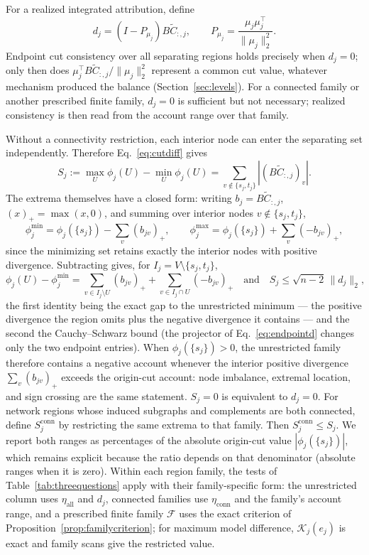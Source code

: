 \documentclass[a4paper,fleqn]{cas-sc}
\newcommand{\norm}[1]{\lVert #1 \rVert}
\begin{document}
For a realized integrated attribution, define
\begin{equation}
d_j=(I-P_{\mu_j})B\widetilde C_{:,j},\qquad
P_{\mu_j}=\frac{\mu_j\mu_j^\top}{\norm{\mu_j}_2^2}.
\label{eq:endpointd}
\end{equation}
Endpoint cut consistency over all separating regions holds precisely when
$d_j=0$; only then does
$\mu_j^\top B\widetilde C_{:,j}/\norm{\mu_j}_2^2$ represent a common cut
value, whatever mechanism produced the balance
(Section~\ref{sec:levels}). For a connected family or another prescribed
finite family, $d_j=0$ is sufficient but not necessary; realized
consistency is then read from the account range over that family.

Without a connectivity restriction, each interior node can enter the
separating set independently. Therefore Eq.~\eqref{eq:cutdiff} gives
\begin{equation}
S_j:=\max_U\phi_j(U)-\min_U\phi_j(U)
=\sum_{v\notin\{s_j,t_j\}}|(B\widetilde C_{:,j})_v|.
\label{eq:cutspread}
\end{equation}
The extrema themselves have a closed form: writing $b_j=B\widetilde
C_{:,j}$, $(x)_+=\max(x,0)$, and summing over interior nodes
$v\notin\{s_j,t_j\}$,
\begin{equation}
\phi_j^{\min}=\phi_j(\{s_j\})-\sum_v(b_{jv})_+,
\qquad
\phi_j^{\max}=\phi_j(\{s_j\})+\sum_v(-b_{jv})_+,
\label{eq:cutextrema}
\end{equation}
since the minimizing set retains exactly the interior nodes with
positive divergence. Subtracting gives, for $I_j=V\setminus\{s_j,t_j\}$,
\begin{equation}
\phi_j(U)-\phi_j^{\min}
=\sum_{v\in I_j\setminus U}(b_{jv})_+
+\sum_{v\in I_j\cap U}(-b_{jv})_+
\quad\text{and}\quad
S_j\le\sqrt{n-2}\,\norm{d_j}_2,
\label{eq:cutgap}
\end{equation}
the first identity being the exact gap to the unrestricted minimum ---
the positive divergence the region omits plus the negative divergence
it contains --- and the second the Cauchy--Schwarz bound (the
projector of Eq.~\eqref{eq:endpointd} changes only the two endpoint
entries). When
$\phi_j(\{s_j\})>0$, the unrestricted family
therefore contains a negative account whenever the interior positive
divergence $\sum_v(b_{jv})_+$ exceeds the origin-cut account: node
imbalance, extremal location, and sign crossing are the same statement.
$S_j=0$ is equivalent to $d_j=0$.
For network regions whose induced subgraphs and complements are both
connected, define $S_j^{\mathrm{conn}}$ by restricting the same extrema to
that family. Then $S_j^{\mathrm{conn}}\le S_j$. We report both
ranges as percentages of the absolute origin-cut value
$|\phi_j(\{s_j\})|$, which remains explicit because the ratio depends
on that denominator (absolute ranges when it is zero). Within each
region family, the tests of Table~\ref{tab:threequestions} apply with
their family-specific form: the unrestricted column uses
$\eta_{\mathrm{all}}$ and $d_j$, connected families use
$\eta_{\mathrm{conn}}$ and the family's account range, and a
prescribed finite family $\mathcal F$ uses the exact criterion of
Proposition~\ref{prop:familycriterion}; for
maximum model difference, $\mathcal K_j(e_j)$ is exact and family
scans give the restricted value.
\end{document}
